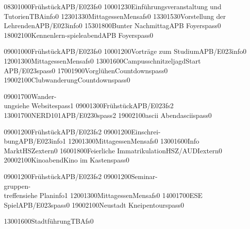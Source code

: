 \documentclass[a5paper,7pt]{scrreprt}
\begin{document}
\begin{center}
\begin{timetable}
   {0830}{1000}{Frühstück}{}{APB/E023}{}{fs}{0}
   {1000}{1230}{Einführungsveranstaltung und Tutorien}{}{TBA}{}{info}{0}
   {1230}{1330}{Mittagessen}{}{Mensa}{}{fs}{0}
   {1330}{1530}{Vorstellung der Lehrenden}{}{APB/E023}{}{info}{0}
   {1530}{1800}{Bunter Nachmittag}{}{APB Foyer}{}{spass}{0}
   {1800}{2100}{Kennenlern-spieleabend}{}{APB Foyer}{}{spass}{0}

   {0900}{1000}{Frühstück}{}{APB/E023}{}{fs}{0}
   {1000}{1200}{Vorträge zum Studium}{}{APB/E023}{}{info}{0}
   {1200}{1300}{Mittagessen}{}{Mensa}{}{fs}{0}
     {1300}{1600}{Campusschnitzeljagd}{}{Start APB/E023}{}{spass}{0}
   {1700}{1900}{Vorglühen}{}{Countdown}{}{spass}{0}
   {1900}{2100}{Clubwanderung}{}{Countdown}{}{spass}{0}

   {0900}{1700}{Wander-\\ung}{}{siehe Website}{}{spass}{1}
   {0900}{1300}{Frühstück}{}{APB/E023}{}{fs}{2}
   {1300}{1700}{NERD101}{}{APB/E023}{0}{spass}{2}
   {1900}{2100}{ascii Abend}{}{ascii}{}{spass}{0}

   {0900}{1200}{Frühstück}{}{APB/E023}{}{fs}{2}
   {0900}{1200}{Einschrei-\\bung}{}{APB/E023}{}{info}{1}
   {1200}{1300}{Mittagessen}{}{Mensa}{}{fs}{0}
   {1300}{1600}{Info Markt}{}{HSZ}{}{extern}{0}
   {1600}{1800}{Feierliche Immatrikulation}{}{HSZ/AUDI}{}{extern}{0}
   {2000}{2100}{Kinoabend}{}{Kino im Kasten}{}{spass}{0}
  
   {0900}{1200}{Frühstück}{}{APB/E023}{}{fs}{2}
     {0900}{1200}{Seminar-\\gruppen-\\treffen}{}{siehe Plan}{}{info}{1}
   {1200}{1300}{Mittagessen}{}{Mensa}{}{fs}{0}
   {1400}{1700}{ESE Spiel}{}{APB/E023}{}{spass}{0}
   {1900}{2100}{Neustadt Kneipentour}{}{}{}{spass}{0}
  
   {1300}{1600}{Stadtführung}{}{TBA}{}{fs}{0}
\end{timetable}
\end{center}
\end{document}
